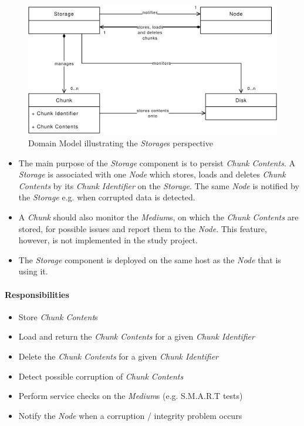\begin{figure}[h]
    \centering
    \includegraphics[width=1\linewidth]{resources/storage_domain_model}
    \caption[Storage Domain Model]{Domain Model illustrating the \emph{Storage}s perspective}
\end{figure}

\begin{itemize}
    \item The main purpose of the \emph{Storage} component is to persist \emph{Chunk Contents}. A \emph{Storage} is associated with one \emph{Node} which stores, loads and deletes \emph{Chunk Contents} by its \emph{Chunk Identifier} on the \emph{Storage}. The same \emph{Node} is notified by the \emph{Storage} e.g. when corrupted data is detected.
    \item A \emph{Chunk} should also monitor the \emph{Medium}s, on which the \emph{Chunk Contents} are stored, for possible issues and report them to the \emph{Node}. This feature, however, is not implemented in the study project.
    \item The \emph{Storage} component is deployed on the same host as the \emph{Node} that is using it.
\end{itemize}


\paragraph{Responsibilities}

\begin{itemize}
    \item Store \emph{Chunk Content}s
    \item Load and return the \emph{Chunk Contents} for a given \emph{Chunk Identifier}
    \item Delete the \emph{Chunk Contents} for a given \emph{Chunk Identifier}
    \item Detect possible corruption of \emph{Chunk Contents}
    \item Perform service checks on the \emph{Medium}s (e.g. S.M.A.R.T tests)
    \item Notify the \emph{Node} when a corruption / integrity problem occurs
\end{itemize}

